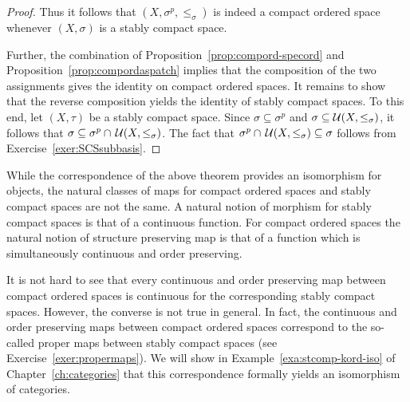 \begin{proof}
 Thus it follows that $(X,\sigma^p,\leq_\sigma)$ is indeed a compact ordered space whenever $(X,\sigma)$ is a stably compact space. 
 
 
 Further, the combination of Proposition~\ref{prop:compord-specord} and Proposition~\ref{prop:compordaspatch} implies that the composition of the two assignments gives the identity on compact ordered spaces. It remains to show that the reverse composition yields the identity of stably compact spaces. 
  To this end, let $(X,\tau)$ be a stably compact space. Since $\sigma\subseteq\sigma^p$ and $\sigma\subseteq\mathcal{U}(X,\leq_\sigma)$, it follows that $\sigma\subseteq\sigma^p\cap\,\mathcal{U}(X,\leq_\sigma)$. The fact that $\sigma^p\cap\,\mathcal{U}(X,\leq_\sigma)\subseteq\sigma$ follows from Exercise~\ref{exer:SCSsubbasis}.
 \end{proof}
 
 While the correspondence of the above theorem provides an isomorphism for objects, the natural classes of maps for compact ordered spaces and stably compact spaces are not the same. A natural notion of morphism for stably compact spaces is that of a continuous function. For compact ordered spaces the natural notion of structure preserving map is that of a function which is simultaneously continuous and order preserving.

It is not hard to see that every continuous and order preserving map between compact ordered spaces is continuous for the corresponding stably compact spaces. However, the converse is not true in general. In fact, the continuous and order preserving maps between compact ordered spaces correspond to the so-called proper maps between stably compact spaces (see Exercise~\ref{exer:propermaps}). We will show in Example~\ref{exa:stcomp-kord-iso} of Chapter~\ref{ch:categories} that this correspondence formally yields an isomorphism of categories.

